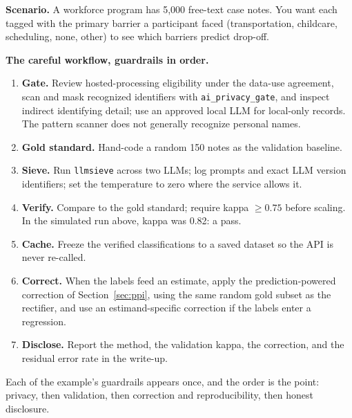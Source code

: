 \begin{appliedexample}\label{ae:ch13-notes}
\textbf{Scenario.} A workforce program has 5,000 free-text case notes. You want each tagged with the primary barrier a participant faced (transportation, childcare, scheduling, none, other) to see which barriers predict drop-off.

\medskip
\textbf{The careful workflow, guardrails in order.}
\begin{enumerate}
    \item \textbf{Gate.} Review hosted-processing eligibility under the data-use agreement, scan and mask recognized identifiers with \texttt{ai\_privacy\_gate}, and inspect indirect identifying detail; use an approved local LLM for local-only records. The pattern scanner does not generally recognize personal names.
    \item \textbf{Gold standard.} Hand-code a random 150 notes as the validation baseline.
    \item \textbf{Sieve.} Run \texttt{llmsieve} across two LLMs; log prompts and exact LLM version identifiers; set the temperature to zero where the service allows it.
    \item \textbf{Verify.} Compare to the gold standard; require kappa $\ge 0.75$ before scaling. In the simulated run above, kappa was 0.82: a pass.
    \item \textbf{Cache.} Freeze the verified classifications to a saved dataset so the API is never re-called.
    \item \textbf{Correct.} When the labels feed an estimate, apply the prediction-powered correction of Section~\ref{sec:ppi}, using the same random gold subset as the rectifier, and use an estimand-specific correction if the labels enter a regression.
    \item \textbf{Disclose.} Report the method, the validation kappa, the correction, and the residual error rate in the write-up.
\end{enumerate}
Each of the example's guardrails appears once, and the order is the point: privacy, then validation, then correction and reproducibility, then honest disclosure.
\end{appliedexample}


